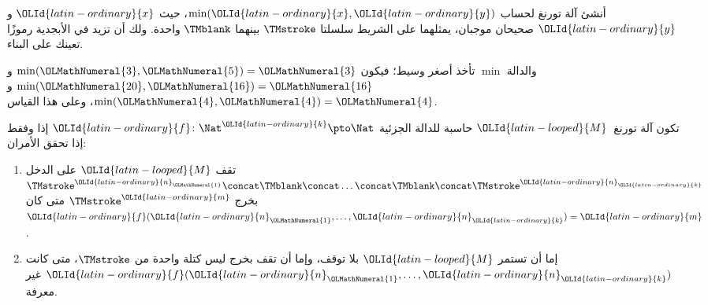 \documentclass[../../../include/open-logic-section]{subfiles}
\begin{document}
\begin{prob}
أنشئ آلة تورنغ لحساب $\min({\OLId{latin-ordinary}{x}},{\OLId{latin-ordinary}{y}})$، حيث ${\OLId{latin-ordinary}{x}}$ و${\OLId{latin-ordinary}{y}}$ صحيحان موجبان، يمثلهما على الشريط سلسلتا $\TMstroke$ بينهما $\TMblank$ واحدة. ولك أن تزيد في الأبجدية رموزًا تعينك على البناء.

والدالة $\min$ تأخذ أصغر وسيط؛ فيكون $\min({\OLMathNumeral{3}},{\OLMathNumeral{5}})={\OLMathNumeral{3}}$ و$\min({\OLMathNumeral{20}},{\OLMathNumeral{16}})={\OLMathNumeral{16}}$ و$\min({\OLMathNumeral{4}},{\OLMathNumeral{4}})={\OLMathNumeral{4}}$، وعلى هذا القياس.
\end{prob}

\begin{defn}
تكون آلة تورنغ~${\OLId{latin-looped}{M}}$ حاسبة للدالة الجزئية ${\OLId{latin-ordinary}{f}}\colon\Nat^{\OLId{latin-ordinary}{k}}\pto\Nat$ إذا وفقط إذا تحقق الأمران:
\begin{enumerate}
\item تقف ${\OLId{latin-looped}{M}}$ على الدخل $\TMstroke^{{\OLId{latin-ordinary}{n}}_{\OLMathNumeral{1}}}\concat\TMblank\concat
    \dots \concat\TMblank\concat\TMstroke^{{\OLId{latin-ordinary}{n}}_{\OLId{latin-ordinary}{k}}}$ بخرج $\TMstroke^{{\OLId{latin-ordinary}{m}}}$ متى كان ${\OLId{latin-ordinary}{f}}({\OLId{latin-ordinary}{n}}_{\OLMathNumeral{1}},\dots,{\OLId{latin-ordinary}{n}}_{\OLId{latin-ordinary}{k}})={\OLId{latin-ordinary}{m}}$.
\item إما أن تستمر ${\OLId{latin-looped}{M}}$ بلا توقف، وإما أن تقف بخرج ليس كتلة واحدة من $\TMstroke$، متى كانت ${\OLId{latin-ordinary}{f}}({\OLId{latin-ordinary}{n}}_{\OLMathNumeral{1}},\dots,{\OLId{latin-ordinary}{n}}_{\OLId{latin-ordinary}{k}})$ غير معرفة.
\end{enumerate}
\end{defn}
\end{document}
